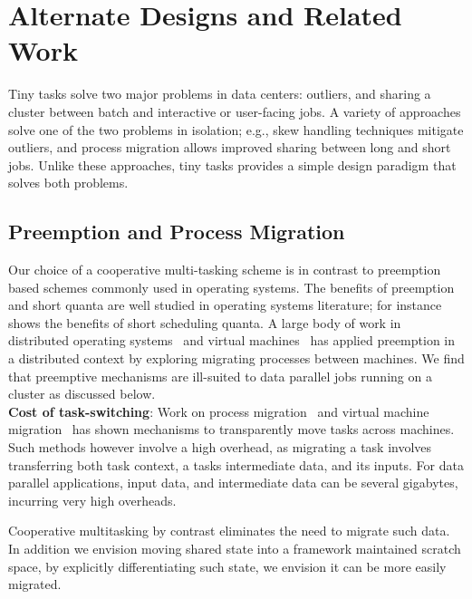 \section{Alternate Designs and Related Work}

Tiny tasks solve two major problems in data centers: outliers, and sharing
a cluster between batch and interactive or user-facing jobs. A variety of
approaches solve one of the two problems in isolation; e.g., skew handling
techniques mitigate outliers, and process migration allows improved
sharing between long and short jobs.  Unlike these approaches, tiny tasks
provides a simple design paradigm that solves both problems.

\subsection{Preemption and Process Migration}
\label{sec:alternate}

Our choice of a cooperative multi-tasking scheme is in contrast to
preemption based schemes commonly used in operating systems. The benefits of 
preemption and short quanta are well studied in operating
systems literature; for instance~\cite{sherman1972trace} shows the benefits
of short scheduling quanta. A large body of work in distributed 
operating systems~\cite{douglis1991transparent,milojivcic2000process,rozier1991overview} and virtual machines~\cite{tanenbaum1990experiences}
has applied preemption in a distributed context by exploring migrating
processes between machines.
We find that preemptive mechanisms are
ill-suited to data parallel jobs running on a cluster as discussed below.\\
\textbf{Cost of task-switching}: Work on process
migration~\cite{douglis1991transparent,milojivcic2000process} and virtual
machine migration~\cite{clark2005live} has shown mechanisms to transparently
move tasks across machines. Such methods however involve a high overhead, as
migrating a task involves transferring both task context, a tasks intermediate
data, and its inputs. For data parallel applications, input data, and intermediate
data can be several gigabytes, incurring very high overheads.

Cooperative multitasking by contrast eliminates the need to migrate such data. In
addition we envision moving shared state into a framework maintained scratch space,
by explicitly differentiating such state, we envision it can be more easily migrated.

